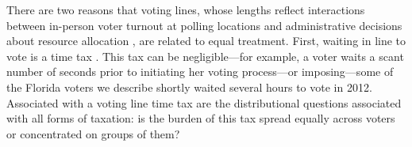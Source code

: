 \documentclass[12pt,titlepage]{article}
\begin{document}









There are two reasons that voting lines, whose lengths reflect
interactions between in-person voter turnout at polling locations and
administrative decisions about resource allocation
\citep{herronsmith:hanoverstudy}, are related to equal treatment.
First, waiting in line to vote is a time tax
\citep{mukherjee:timetax}. This tax can be negligible---for example, a
voter waits a scant number of seconds prior to initiating her voting
process---or imposing---some of the Florida voters we describe shortly
waited several hours to vote in 2012. Associated with a voting line
time tax are the distributional questions associated with all forms of
taxation: is the burden of this tax spread equally across voters or
concentrated on groups of them?
\end{document}
